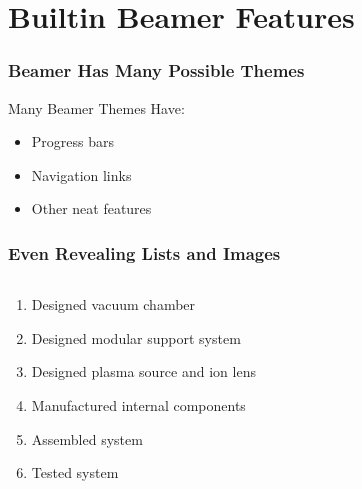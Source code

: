 \documentclass{beamer}
\begin{document}
    \section{Builtin Beamer Features}
        \begin{frame}
            \frametitle{Beamer Has Many Possible Themes}
            Many Beamer Themes Have:
            \begin{itemize}
                \item<1-> Progress bars
                \item<2-> Navigation links
                \item<3-> Other neat features
            \end{itemize}
        \end{frame}
        \begin{frame}
            \frametitle{Even Revealing Lists and Images}
            \begin{columns}[T]
                \begin{column}{0.5\textwidth}
                    \begin{enumerate}
                        \item<1-> Designed vacuum chamber
                        \item<2-> Designed modular support system
                        \item<3-> Designed plasma source and ion lens
                        \item<4-> Manufactured internal components
                        \item<5-> Assembled system
                        \item<6-> Tested system
                    \end{enumerate}
                \end{column}
                \begin{column}{0.5\textwidth}
                    \begin{figure}[htbp]
                        \begin{centering}
                            \begin{overlayarea}{\textwidth}{\textheight}

\end{overlayarea}
\end{centering}
\end{figure}
\end{column}
\end{columns}
\end{frame}
\end{document}
